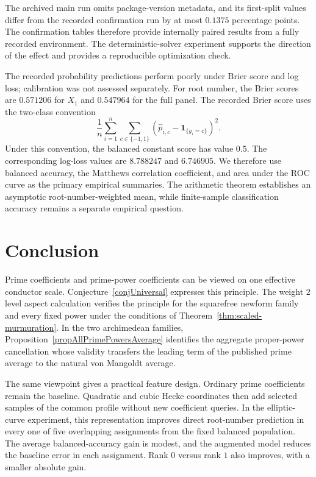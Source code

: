 \documentclass[12pt,reqno]{amsart}
\numberwithin{equation}{section}
\theoremstyle{plain}
\theoremstyle{definition}
\theoremstyle{remark}
\begin{document}
The archived main run omits package-version metadata, and its first-split values differ from the recorded confirmation run by at most $0.1375$ percentage points.
The confirmation tables therefore provide internally paired results from a fully recorded environment.
The deterministic-solver experiment supports the direction of the effect and provides a reproducible optimization check.

The recorded probability predictions perform poorly under Brier score and log loss; calibration was not assessed separately.
For root number, the Brier scores are $0.571206$ for $X_1$ and $0.547964$ for the full panel.
The recorded Brier score uses the two-class convention
\begin{equation*}
\frac1n\sum_{i=1}^n\sum_{c\in\{-1,1\}}
\left(\widehat p_{i,c}-{\boldsymbol 1}_{\{y_i=c\}}\right)^2.
\end{equation*}
Under this convention, the balanced constant score has value $0.5$.
The corresponding log-loss values are $8.788247$ and $6.746905$.
We therefore use balanced accuracy, the Matthews correlation coefficient, and area under the ROC curve as the primary empirical summaries.
The arithmetic theorem establishes an asymptotic root-number-weighted mean, while finite-sample classification accuracy remains a separate empirical question.

\section{Conclusion}

Prime coefficients and prime-power coefficients can be viewed on one effective conductor scale.
Conjecture~\ref{conjUniversal} expresses this principle.
The weight $2$ level aspect calculation verifies the principle for the squarefree newform family and every fixed power under the conditions of Theorem~\ref{thm:scaled-murmuration}.
In the two archimedean families, Proposition~\ref{propAllPrimePowersAverage} identifies the aggregate proper-power cancellation whose validity transfers the leading term of the published prime average to the natural von Mangoldt average.

The same viewpoint gives a practical feature design.  Ordinary prime coefficients remain the baseline.
Quadratic and cubic Hecke coordinates then add selected samples of the common profile without new coefficient queries.
In the elliptic-curve experiment, this representation improves direct root-number prediction in every one of
five overlapping assignments from the fixed balanced population.
The average balanced-accuracy gain is modest, and the augmented model reduces the baseline error in each assignment.
Rank $0$ versus rank $1$ also improves, with a smaller absolute gain.
\end{document}
